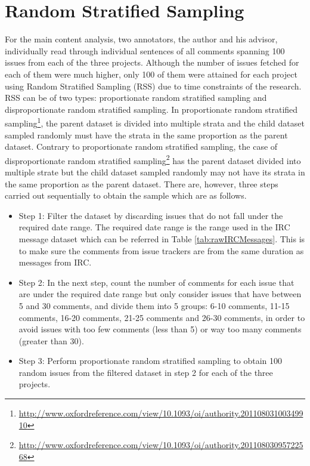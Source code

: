 \documentclass[a4paper,12pt,twoside]{report}
\begin{document}
\section{Random Stratified Sampling}
For the main content analysis, two annotators, the author and his advisor, individually read through individual sentences of all comments spanning 100 issues from each of the three projects. Although the number of issues fetched for each of them were much higher, only 100 of them were attained for each project using Random Stratified Sampling (RSS) due to time constraints of the research. RSS can be of two types: proportionate random stratified sampling and disproportionate random stratified sampling. In proportionate random stratified sampling\footnote{\url{http://www.oxfordreference.com/view/10.1093/oi/authority.20110803100349910}}, the parent dataset is divided into multiple strata and the child dataset sampled randomly must have the strata in the same proportion as the parent dataset. Contrary to proportionate random stratified sampling, the case of disproportionate random stratified sampling\footnote{\url{http://www.oxfordreference.com/view/10.1093/oi/authority.20110803095722568}} has the parent dataset divided into multiple strate but the child dataset sampled randomly may not have its strata in the same proportion as the parent dataset. There are, however, three steps carried out sequentially to obtain the sample which are as follows.

\begin{itemize}
\item {Step 1:} Filter the dataset by discarding issues that do not fall under the required date range. The required date range is the range used in the IRC message dataset which can be referred in Table \ref{tab:rawIRCMessages}. This is to make sure the comments from issue trackers are from the same duration as messages from IRC. 
\item {Step 2:} In the next step, count the number of comments for each issue that are under the required date range but only consider issues that have between 5 and 30 comments, and divide them into 5 groups: 6-10 comments, 11-15 comments, 16-20 comments, 21-25 comments and 26-30 comments, in order to avoid issues with too few comments (less than 5) or way too many comments (greater than 30). 
\item {Step 3:} Perform proportionate random stratified sampling to obtain 100 random issues from the filtered dataset in step 2 for each of the three projects. 
\end{itemize}
\end{document}
